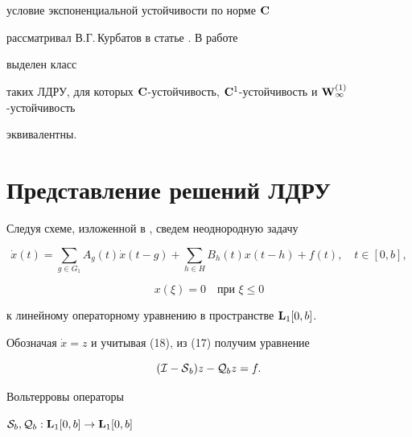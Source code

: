 условие экспоненциальной устойчивости по норме $\bold C$


рассматривал В.Г.\,Курбатов в статье \cite{Ku4}. В работе \cite{Ku5}


выделен класс


таких ЛДРУ, для которых $\bold C$-устойчивость, $\bold 


C^1$-устойчивость и $\bold W_\infty^{(1)}$-устойчивость


эквивалентны.





\section{Представление решений ЛДРУ}





Следуя схеме, изложенной в \cite{Az1}, сведем неоднородную задачу


%


\begin{equation}


\Dot x(t)=\sum\limits_{g\in G_1}A_g(t)\Dot x(t-g)+


\sum\limits_{h\in H}B_h(t)x(t-h)+f(t),\quad t\in[0,b],


\end{equation}


%


\begin{equation}


x(\xi)=0\quad\text{при }\xi\le 0


\end{equation}


%


к линейному операторному уравнению в пространстве $\bold L_1[0,b]$.


Обозначая $\Dot x=z$ и учитывая (18), из (17) получим уравнение


%


\begin{equation}


({\cal I-S}_b)z-{\cal Q}_bz=f.


\end{equation}


%





Вольтерровы операторы


${\cal S}_b,{\cal Q}_b:\bold L_1[0,b]\to\bold L_1[0,b]$


